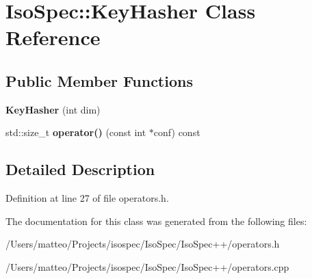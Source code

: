 \hypertarget{class_iso_spec_1_1_key_hasher}{}\section{Iso\+Spec\+:\+:Key\+Hasher Class Reference}
\label{class_iso_spec_1_1_key_hasher}
\subsection*{Public Member Functions}
\begin{DoxyCompactItemize}
\item 
\mbox{\label{class_iso_spec_1_1_key_hasher_a094e6c2b6a3c9fa09b81187cbdf50de3}} 
{\bfseries Key\+Hasher} (int dim)
\item 
\mbox{\label{class_iso_spec_1_1_key_hasher_a32c10222b6c45a5f0f290821c476e83f}} 
std\+::size\+\_\+t {\bfseries operator()} (const int $\ast$conf) const
\end{DoxyCompactItemize}


\subsection{Detailed Description}


Definition at line 27 of file operators.\+h.



The documentation for this class was generated from the following files\+:\begin{DoxyCompactItemize}
\item 
/\+Users/matteo/\+Projects/isospec/\+Iso\+Spec/\+Iso\+Spec++/operators.\+h\item 
/\+Users/matteo/\+Projects/isospec/\+Iso\+Spec/\+Iso\+Spec++/operators.\+cpp\end{DoxyCompactItemize}
